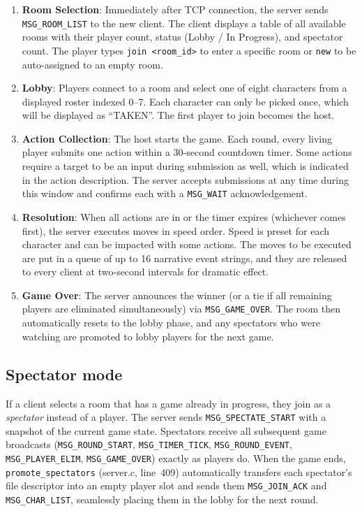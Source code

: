 \documentclass[11pt,letterpaper]{article}
\begin{document}
\begin{enumerate}[leftmargin=2em]
    \item \textbf{Room Selection}: Immediately after TCP connection, the server sends \texttt{MSG\_ROOM\_LIST} to the new client. The client displays a table of all available rooms with their player count, status (Lobby / In Progress), and spectator count. The player types \texttt{join <room\_id>} to enter a specific room or \texttt{new} to be auto-assigned to an empty room.
    \item \textbf{Lobby}: Players connect to a room and select one of eight characters from a displayed roster indexed 0--7. Each character can only be picked once, which will be displayed as ``TAKEN''. The first player to join becomes the host.
    \item \textbf{Action Collection}: The host starts the game. Each round, every living player submits one action within a 30-second countdown timer. Some actions require a target to be an input during submission as well, which is indicated in the action description. The server accepts submissions at any time during this window and confirms each with a \texttt{MSG\_WAIT} acknowledgement.
    \item \textbf{Resolution}: When all actions are in or the timer expires (whichever comes first), the server executes moves in speed order. Speed is preset for each character and can be impacted with some actions. The moves to be executed are put in a queue of up to 16 narrative event strings, and they are released to every client at two-second intervals for dramatic effect.
    \item \textbf{Game Over}: The server announces the winner (or a tie if all remaining players are eliminated simultaneously) via \texttt{MSG\_GAME\_OVER}. The room then automatically resets to the lobby phase, and any spectators who were watching are promoted to lobby players for the next game.
\end{enumerate}

\subsection*{Spectator mode}

If a client selects a room that has a game already in progress, they join as a \emph{spectator} instead of a player. The server sends \texttt{MSG\_SPECTATE\_START} with a snapshot of the current game state. Spectators receive all subsequent game broadcasts (\texttt{MSG\_ROUND\_START}, \texttt{MSG\_TIMER\_TICK}, \texttt{MSG\_ROUND\_EVENT}, \texttt{MSG\_PLAYER\_ELIM}, \texttt{MSG\_GAME\_OVER}) exactly as players do. When the game ends, \texttt{promote\_spectators} (server.c, line~409) automatically transfers each spectator's file descriptor into an empty player slot and sends them \texttt{MSG\_JOIN\_ACK} and \texttt{MSG\_CHAR\_LIST}, seamlessly placing them in the lobby for the next round.
\end{document}
